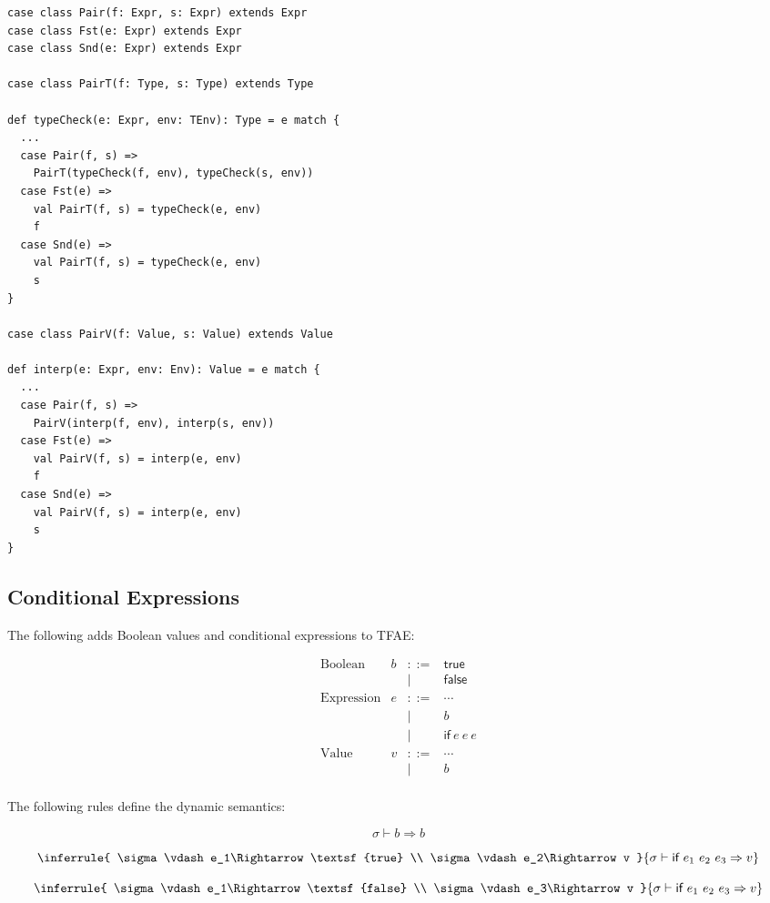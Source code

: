 \begin{verbatim}
case class Pair(f: Expr, s: Expr) extends Expr
case class Fst(e: Expr) extends Expr
case class Snd(e: Expr) extends Expr

case class PairT(f: Type, s: Type) extends Type

def typeCheck(e: Expr, env: TEnv): Type = e match {
  ...
  case Pair(f, s) =>
    PairT(typeCheck(f, env), typeCheck(s, env))
  case Fst(e) =>
    val PairT(f, s) = typeCheck(e, env)
    f
  case Snd(e) =>
    val PairT(f, s) = typeCheck(e, env)
    s
}

case class PairV(f: Value, s: Value) extends Value

def interp(e: Expr, env: Env): Value = e match {
  ...
  case Pair(f, s) =>
    PairV(interp(f, env), interp(s, env))
  case Fst(e) =>
    val PairV(f, s) = interp(e, env)
    f
  case Snd(e) =>
    val PairV(f, s) = interp(e, env)
    s
}
\end{verbatim}

\subsection{Conditional Expressions}

The following adds Boolean values and conditional expressions to TFAE:

\[
\begin{array}{lrcl}
\text{Boolean} & b & ::= & \textsf{true} \\
&&|& \textsf{false} \\
\text{Expression} & e & ::= & \cdots \\
&& | & b \\
&& | & \textsf{if}\ e\ e\ e \\
\text{Value} & v & ::= & \cdots \\
&& | & b \\
\end{array}
\]

The following rules define the dynamic semantics:

\[
\sigma\vdash b\Rightarrow b
\]

\[
\inferrule
{
  \sigma\vdash e_1\Rightarrow\textsf{true} \\
  \sigma\vdash e_2\Rightarrow v
}
{ \sigma\vdash \textsf{if}\ e_1\ e_2\ e_3\Rightarrow v }
\]

\[
\inferrule
{
  \sigma\vdash e_1\Rightarrow\textsf{false} \\
  \sigma\vdash e_3\Rightarrow v
}
{ \sigma\vdash \textsf{if}\ e_1\ e_2\ e_3\Rightarrow v }
\]

